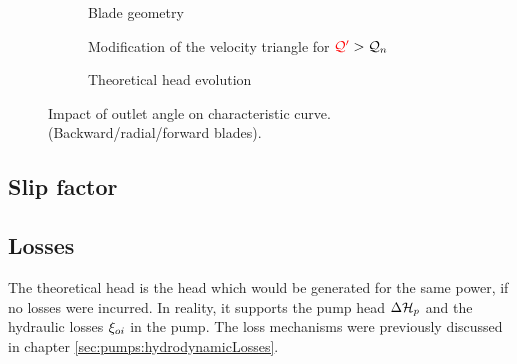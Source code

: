 \begin{figure}[!h]
  
  \begin{subfigure}{\textwidth}
    \caption{Blade geometry}
  \end{subfigure}
  \vspace{2ex}
  \begin{subfigure}{\textwidth}
      \caption{Modification of the velocity triangle for $\textcolor{red}{\mathcal Q^\prime} > \mathcal Q_n$}
  \end{subfigure}

  \vspace{2ex}
  \begin{subfigure}{\textwidth}
    \caption{Theoretical head evolution}
  \end{subfigure}
  
  \caption{Impact of outlet angle on characteristic curve. (Backward/radial/forward blades).}
  \label{fig:slopeCharacteristic}
\end{figure}


\subsection{Slip factor}



\subsection{Losses}


The theoretical head is the head which would be generated for the same
power, if no losses were incurred. In reality, it supports the pump
head $\Delta \mathcal H_p$ and the hydraulic losses $\xi_{oi}$ in the pump. The
loss mechanisms were previously discussed in chapter
\ref{sec:pumps:hydrodynamicLosses}.

